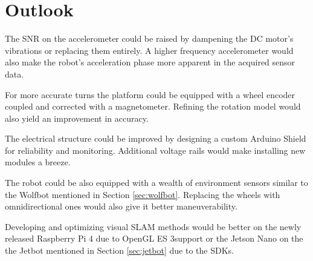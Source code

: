 \documentclass[class=report, crop=false]{standalone}
\begin{document}
\chapter{Outlook}\label{cha:outlook}

The SNR on the accelerometer could be raised by dampening the DC motor's vibrations or replacing them entirely. A higher frequency accelerometer would also make the robot's acceleration phase more apparent in the acquired sensor data.

For more accurate turns the platform could be equipped with a wheel encoder  coupled and corrected with a magnetometer. Refining the rotation model would also yield an improvement in accuracy.

The electrical structure could be improved by designing a custom Arduino Shield for reliability and monitoring. Additional voltage rails would make installing new modules a breeze.

The robot could be also equipped with a wealth of environment sensors similar to the Wolfbot mentioned in Section \ref{sec:wolfbot}. Replacing the wheels with omnidirectional ones would also give it better maneuverability.

Developing and optimizing visual SLAM methods would be better on the newly released Raspberry Pi 4 due to OpenGL ES 3\footnotemark support or the Jetson Nano on the the Jetbot mentioned in Section \ref{sec:jetbot} due to the SDKs.

\end{document}
